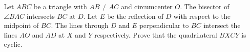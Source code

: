 Let 
$ABC$
 be a triangle with 
$AB \neq AC$
 and circumcenter 
$O$.
 The bisector of 
$\angle BAC$
 intersects 
$BC$
 at 
$D$.
 Let 
$E$
 be the reflection of 
$D$
 with respect to the midpoint of 
$BC$.
 The lines through 
$D$
 and 
$E$
 perpendicular to 
$BC$
 intersect the lines 
$AO$
 and 
$AD$
 at 
$X$
 and 
$Y$
 respectively. Prove that the quadrilateral 
$BXCY$
 is cyclic.
